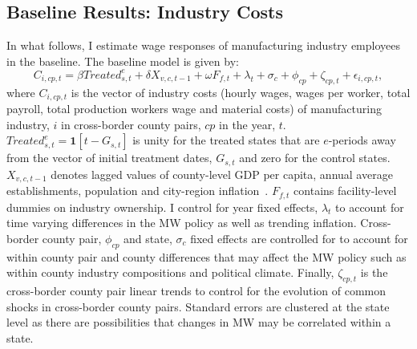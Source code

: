 \documentclass[12pt, english]{article}
\begin{document}
    \subsection{Baseline Results: Industry Costs}\label{subsec:baseline-results-industry-costs}
    In what follows, I estimate wage responses of manufacturing industry employees in the baseline. The baseline model is given by:
    \begin{equation}
        C_{i,cp,t} = \beta Treated_{s,t}^e + \delta X_{v,c,t-1} + \omega F_{f,t} + \lambda_{t} + \sigma_{c} + \phi_{cp} + \zeta_{cp,t} + \epsilon_{i,cp,t},\label{eq:baseline-wages}
    \end{equation}
    where $C_{i,cp,t}$ is the vector of industry costs (hourly wages, wages per worker, total payroll, total production workers wage and material costs) of manufacturing industry, $i$ in cross-border county pairs, $cp$ in the year, $t$. $Treated_{s,t}^e = \textbf{1}[t - G_{s,t}]$ is unity for the treated states that are $e$-periods away from the vector of initial treatment dates, $G_{s,t}$ and zero for the control states. $X_{v,c,t-1}$ denotes lagged values of county-level GDP per capita, annual average establishments, population and city-region inflation~\parencite{gopalan2021state, dube2010minimum, clemens2019making}. $F_{f,t}$ contains facility-level dummies on industry ownership. I control for year fixed effects, $\lambda_{t}$ to account for time varying differences in the MW policy as well as trending inflation. Cross-border county pair, $\phi_{cp}$ and state, $\sigma_{c}$ fixed effects are controlled for to account for within county pair and county differences that may affect the MW policy such as within county industry compositions and political climate. Finally, $\zeta_{cp,t}$ is the cross-border county pair linear trends to control for the evolution of common shocks in cross-border county pairs. Standard errors are clustered at the state level as there are possibilities that changes in MW may be correlated within a state.
    
\end{document}
